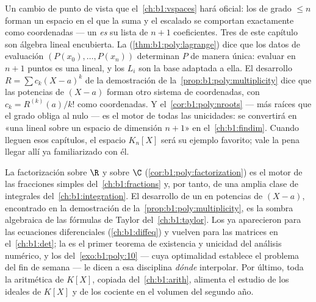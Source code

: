 \begin{remark}\label{rem:b1:poly:interlude}
Un cambio de punto de vista que el~\cref{ch:b1:vspaces} hará oficial:
los  de grado $\leq n$ forman un espacio en el que la suma y
el escalado se comportan exactamente como coordenadas --- un
 \emph{es} su lista de $n + 1$ coeficientes. Tres
 de este capítulo son álgebra lineal encubierta. La
 (\cref{thm:b1:poly:lagrange}) dice que los
datos de evaluación $(P(x_0), \dots, P(x_n))$ determinan $P$ de manera
única: evaluar en $n + 1$ puntos es una  lineal, y los $L_i$
son la base adaptada a ella. El desarrollo $R = \sum c_k(X - a)^k$ de
la demostración de la~\cref{prop:b1:poly:multiplicity} dice que las
potencias de $(X - a)$ forman otro sistema de coordenadas, con
$c_k = R^{(k)}(a)/k!$ como coordenadas. Y
el~\cref{cor:b1:poly:nroots} --- más raíces que el grado obliga al
 nulo --- es el motor de todas las unicidades: se convertirá
en «una  lineal  sobre un espacio de dimensión
$n + 1$» en el~\cref{ch:b1:findim}. Cuando lleguen esos capítulos, el
espacio $K_n[X]$ será su ejemplo favorito; vale la pena llegar allí ya
familiarizado con él.
\end{remark}

\begin{remark}\label{rem:b1:poly:whereused}
La factorización sobre $\R$ y sobre $\C$
(\cref{cor:b1:poly:factorization}) es el motor de las fracciones
simples del~\cref{ch:b1:fractions} y, por tanto, de una amplia clase de
integrales del~\cref{ch:b1:integration}. El desarrollo de un
 en potencias de $(X - a)$, encontrado en la demostración de
la~\cref{prop:b1:poly:multiplicity}, es la sombra algebraica de las
fórmulas de Taylor del~\cref{ch:b1:taylor}. Los  ya aparecieron para las ecuaciones diferenciales
(\cref{ch:b1:diffeq}) y vuelven para las matrices en
el~\cref{ch:b1:det}; la  es el primer teorema
de existencia y unicidad del análisis numérico, y los
 del~\cref{exo:b1:poly:10} --- cuya optimalidad
establece el problema del fin de semana --- le dicen a esa disciplina
\emph{dónde} interpolar. Por último, toda la aritmética de $K[X]$,
copiada del~\cref{ch:b1:arith}, alimenta el estudio de los ideales de
$K[X]$ y de los  cociente en el volumen del segundo año.
\end{remark}


